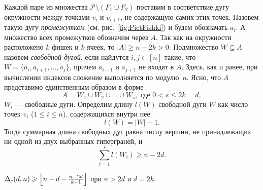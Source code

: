 Каждой паре из множества ${\mathcal P}\setminus(F_1\cup F_2)$ поставим в соответствие 
дугу окружности между точками $v_i$ и $v_{i+1}$, не содержащую самих этих точек.
Назовем такую дугу \emph{промежутком} (см. рис.~\ref{fig:PictFishki}) и будем обозначать $a_i$. 
А множество всех промежутков обозначим через $A$. 
Так как на окружности расположено $k$ фишек и $k$ ячеек, то $|A| \ge n - 2k > 0$.
Подмножество $W\subseteq A$ назовем \emph{свободной дугой}, если найдутся $i,j \in [n]$
такие, что $W=\{a_i, a_{i+1}, \ldots, a_j\}$,
причем $a_{i-1}$ и $a_{j+1}$ не входят в $A$.
Здесь, как и ранее, при вычислении индексов сложение выполняется по модулю~$n$.
Ясно, что $A$ представимо единственным образом в форме
\begin{equation}
\label{GapSet}
A=W_1 \cup W_2 \cup \ldots \cup W_s, \mbox{ где } 0 < s \le 2k = d,
\end{equation}
$W_i$ --- свободные дуги. 
Определим длину $l(W)$ свободной дуги $W$ как число точек $v_i$ ($1\le i\le n$), 
содержащихся внутри нее:
$$
l(W)=|W|-1.
$$
Тогда суммарная длина свободных дуг равна числу вершин, 
не принадлежащих ни одной из двух выбранных гиперграней, и
$$
\sum^{s}_{i=1} l(W_i)\ge n-2d.
$$



%
%

\begin{lemma}
	\label{lemma:RidgeGe}
	\({\Delta_{c}(d,n)} \geqslant \left\lfloor n-d - \frac{n-2d}{k+1} \right\rfloor\) при $n > 2d$ и $d = 2k$.
\end{lemma}

